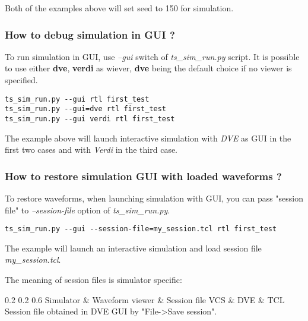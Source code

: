 \documentclass{tropic_design_spec}
\begin{document}
Both of the examples above will set seed to 150 for simulation.


\subsubsection{How to debug simulation in GUI ?}
\label{sec:how-to-debug-simulation-in-gui}

To run simulation in GUI, use \textit{--gui} switch of \textit{ts_sim_run.py} script.
It is possible to use either \textbf{dve}, \textbf{verdi} as wiever, \textbf{dve} being
the default choice if no viewer is specified.

\begin{lstlisting}
ts_sim_run.py --gui rtl first_test
ts_sim_run.py --gui=dve rtl first_test
ts_sim_run.py --gui verdi rtl first_test
\end{lstlisting}

The example above will launch interactive simulation with \textit{DVE} as GUI in the
first two cases and with \textit{Verdi} in the third case.



\subsubsection{How to restore simulation GUI with loaded waveforms ?}
\label{sec:how-to-restore-simulation-gui-with-loaded-waveforms}

To restore waveforms, when launching simulation with GUI, you can pass "session file"
to \textit{--session-file} option of \textit{ts_sim_run.py}.

\begin{lstlisting}
ts_sim_run.py --gui --session-file=my_session.tcl rtl first_test
\end{lstlisting}

The example will launch an interactive simulation and load session file \textit{my_session.tcl}.

The meaning of session files is simulator specific:

\begin{TropicRatioTable3Col}
    {0.2}             {0.2}               {0.6}
	{Simulator 	    & Waveform viewer 	& Session file}
        VCS         & DVE               & TCL Session file obtained in DVE GUI by "File->Save session". \Ttlb
\end{TropicRatioTable3Col}
\end{document}

